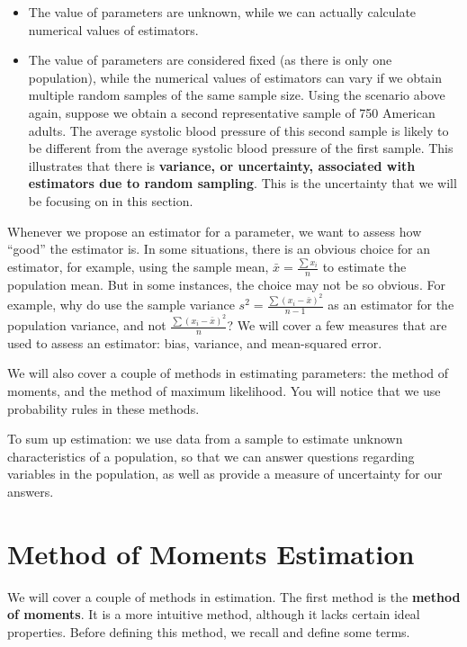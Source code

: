 \documentclass[
]{book}
\providecommand{\tightlist}{%
  \setlength{\itemsep}{0pt}\setlength{\parskip}{0pt}}
\begin{document}
\begin{itemize}
\tightlist
\item
  The value of parameters are unknown, while we can actually calculate numerical values of estimators.
\item
  The value of parameters are considered fixed (as there is only one population), while the numerical values of estimators can vary if we obtain multiple random samples of the same sample size. Using the scenario above again, suppose we obtain a second representative sample of 750 American adults. The average systolic blood pressure of this second sample is likely to be different from the average systolic blood pressure of the first sample. This illustrates that there is \textbf{variance, or uncertainty, associated with estimators due to random sampling}. This is the uncertainty that we will be focusing on in this section.
\end{itemize}

Whenever we propose an estimator for a parameter, we want to assess how ``good'' the estimator is. In some situations, there is an obvious choice for an estimator, for example, using the sample mean, \(\bar{x} = \frac{\sum x_i}{n}\) to estimate the population mean. But in some instances, the choice may not be so obvious. For example, why do use the sample variance \(s^2 = \frac{\sum (x_i - \bar{x})^2}{n-1}\) as an estimator for the population variance, and not \(\frac{\sum (x_i - \bar{x})^2}{n}\)? We will cover a few measures that are used to assess an estimator: bias, variance, and mean-squared error.

We will also cover a couple of methods in estimating parameters: the method of moments, and the method of maximum likelihood. You will notice that we use probability rules in these methods.

To sum up estimation: we use data from a sample to estimate unknown characteristics of a population, so that we can answer questions regarding variables in the population, as well as provide a measure of uncertainty for our answers.

\section{Method of Moments Estimation}\label{method-of-moments-estimation}

We will cover a couple of methods in estimation. The first method is the \textbf{method of moments}. It is a more intuitive method, although it lacks certain ideal properties. Before defining this method, we recall and define some terms.
\end{document}
